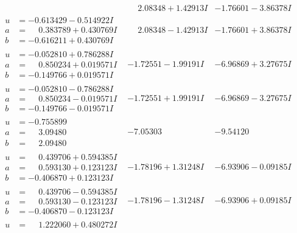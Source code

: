 \documentclass[1p]{elsarticle_modified}
\theoremstyle{definition}
\begin{document}
$$\begin{array}{c|c|c}
 & \phantom{-}2.08348 + 1.42913 I & -1.76601 - 3.86378 I \\ \hline\begin{aligned}
u &= -0.613429 - 0.514922 I \\
a &= \phantom{-}0.383789 + 0.430769 I \\
b &= -0.616211 + 0.430769 I\end{aligned}
 & \phantom{-}2.08348 - 1.42913 I & -1.76601 + 3.86378 I \\ \hline\begin{aligned}
u &= -0.052810 + 0.786288 I \\
a &= \phantom{-}0.850234 + 0.019571 I \\
b &= -0.149766 + 0.019571 I\end{aligned}
 & -1.72551 - 1.99191 I & -6.96869 + 3.27675 I \\ \hline\begin{aligned}
u &= -0.052810 - 0.786288 I \\
a &= \phantom{-}0.850234 - 0.019571 I \\
b &= -0.149766 - 0.019571 I\end{aligned}
 & -1.72551 + 1.99191 I & -6.96869 - 3.27675 I \\ \hline\begin{aligned}
u &= -0.755899\phantom{ +0.000000I} \\
a &= \phantom{-}3.09480\phantom{ +0.000000I} \\
b &= \phantom{-}2.09480\phantom{ +0.000000I}\end{aligned}
 & -7.05303\phantom{ +0.000000I} & -9.54120\phantom{ +0.000000I} \\ \hline\begin{aligned}
u &= \phantom{-}0.439706 + 0.594385 I \\
a &= \phantom{-}0.593130 + 0.123123 I \\
b &= -0.406870 + 0.123123 I\end{aligned}
 & -1.78196 + 1.31248 I & -6.93906 - 0.09185 I \\ \hline\begin{aligned}
u &= \phantom{-}0.439706 - 0.594385 I \\
a &= \phantom{-}0.593130 - 0.123123 I \\
b &= -0.406870 - 0.123123 I\end{aligned}
 & -1.78196 - 1.31248 I & -6.93906 + 0.09185 I \\ \hline\begin{aligned}
u &= \phantom{-}1.222060 + 0.480272 I \\

\end{aligned}
\end{array}$$
\end{document}
